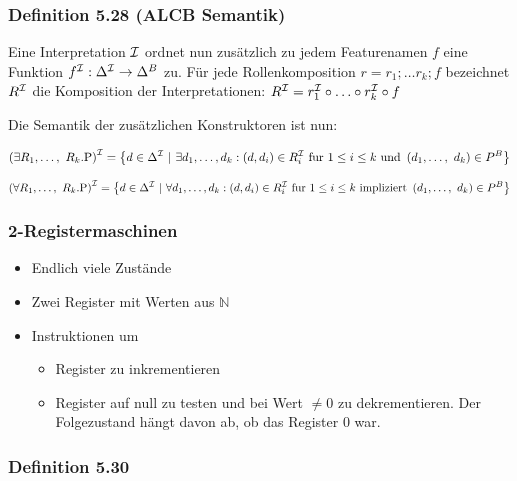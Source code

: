 \subsubsection{Definition 5.28 (ALCB
Semantik)}\label{definition-5.28-alcb-semantik}

Eine Interpretation $\mathcal{I}$ ordnet nun zusätzlich zu jedem Featurenamen
$f$ eine Funktion $f^{\mathcal{I}}:\Delta^{\mathcal{I}} \rightarrow \Delta^{B}$ zu. Für
jede Rollenkomposition $r = r_{1};\ldots r_{k};f$ bezeichnet $R^{\mathcal{I}}$
die Komposition der Interpretationen:
$R^{\mathcal{I}} = r_{1}^{\mathcal{I}} \circ \ldots \circ r_{k}^{\mathcal{I}} \circ f$

Die Semantik der zusätzlichen Konstruktoren ist nun:

\[\left( \exists R_{1},\ldots,\ R_{k}\text{.P} \right)^\MI = \left\{ d \in \Delta^\MI\ |\ \exists d_{1},\ldots,d_{k}:\left( d,d_{i} \right) \in R_{i}^\MI\ \mathrm{fur}\ 1 \leq i \leq k\ \mathrm{\text{und}}\ \left( d_{1},\ldots,\ d_{k} \right) \in P^{B} \right\}\]

\[\left( \forall R_{1},\ldots,\ R_{k}\text{.P} \right)^\MI = \left\{ d \in \Delta^\MI\ |\ \forall d_{1},\ldots,d_{k}:\left( d,d_{i} \right) \in R_{i}^\MI\ \mathrm{fur}\ 1 \leq i \leq k\ \mathrm{\text{impliziert}}\ \left( d_{1},\ldots,\ d_{k} \right) \in P^{B} \right\}\]

\subsubsection{2-Registermaschinen}\label{registermaschinen}

\begin{itemize}
\item
  Endlich viele Zustände
\item
  Zwei Register mit Werten aus $\mathbb{N}$
\item
  Instruktionen um

  \begin{itemize}
  \item
    Register zu inkrementieren
  \item
    Register auf null zu testen und bei Wert $\neq 0$ zu
    dekrementieren. Der Folgezustand hängt davon ab, ob das Register
    $0$ war.
  \end{itemize}
\end{itemize}

\subsubsection{Definition 5.30}\label{definition-5.30}

